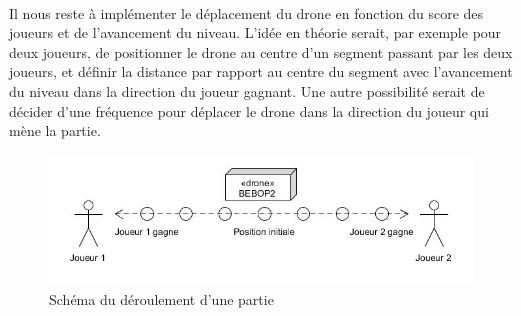 \paragraph{}
Il nous reste à implémenter le déplacement du drone en fonction du score des joueurs et de l'avancement du niveau. L'idée en théorie serait, par exemple pour deux joueurs, de positionner le drone au centre d'un segment passant par les deux joueurs, et définir la distance par rapport au centre du segment avec l'avancement du niveau dans la direction du joueur gagnant.
Une autre possibilité serait de décider d'une fréquence pour déplacer le drone dans la direction du joueur qui mène la partie.

\begin{figure}[ht]
\begin{center}
\includegraphics[scale=0.5]{images/partie.jpg}
\caption{Schéma du déroulement d'une partie}
\end{center}
\end{figure}